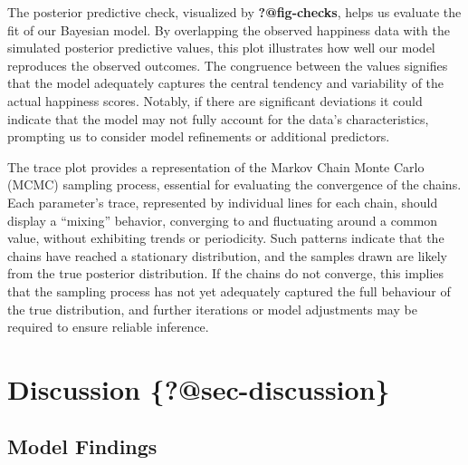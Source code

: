 \documentclass[
  letterpaper,
  DIV=11,
  numbers=noendperiod]{scrartcl}
\begin{document}
The posterior predictive check, visualized by \textbf{?@fig-checks},
helps us evaluate the fit of our Bayesian model. By overlapping the
observed happiness data with the simulated posterior predictive values,
this plot illustrates how well our model reproduces the observed
outcomes. The congruence between the values signifies that the model
adequately captures the central tendency and variability of the actual
happiness scores. Notably, if there are significant deviations it could
indicate that the model may not fully account for the data's
characteristics, prompting us to consider model refinements or
additional predictors.

The trace plot provides a representation of the Markov Chain Monte Carlo
(MCMC) sampling process, essential for evaluating the convergence of the
chains. Each parameter's trace, represented by individual lines for each
chain, should display a ``mixing'' behavior, converging to and
fluctuating around a common value, without exhibiting trends or
periodicity. Such patterns indicate that the chains have reached a
stationary distribution, and the samples drawn are likely from the true
posterior distribution. If the chains do not converge, this implies that
the sampling process has not yet adequately captured the full behaviour
of the true distribution, and further iterations or model adjustments
may be required to ensure reliable inference.

\hypertarget{discussion-sec-discussion}{%
\section{\texorpdfstring{Discussion
\{\textbf{?@sec-discussion}\}}{Discussion \{?@sec-discussion\}}}\label{discussion-sec-discussion}}

\hypertarget{sec-first-point}{%
\subsection{Model Findings}\label{sec-first-point}}
\end{document}
